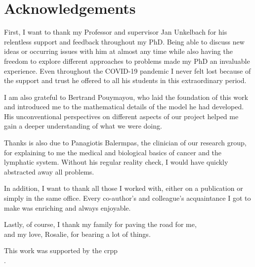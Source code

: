 \documentclass[\relativeRoot/main.tex]{subfiles}
\begin{document}


\chapter*{Acknowledgements}
First, I want to thank my Professor and supervisor Jan Unkelbach for his relentless support and feedback throughout my PhD. Being able to discuss new ideas or occurring issues with him at almost any time while also having the freedom to explore different approaches to problems made my PhD an invaluable experience. Even throughout the COVID-19 pandemic I never felt lost because of the support and trust he offered to all his students in this extraordinary period.

I am also grateful to Bertrand Pouymayou, who laid the foundation of this work and introduced me to the mathematical details of the model he had developed. His unconventional perspectives on different aspects of our project helped me gain a deeper understanding of what we were doing.

Thanks is also due to Panagiotis Balermpas, the clinician of our research group, for explaining to me the medical and biological basics of cancer and the lymphatic system. Without his regular reality check, I would have quickly abstracted away all problems.

In addition, I want to thank all those I worked with, either on a publication or simply in the same office. Every co-author's and colleague's acquaintance I got to make was enriching and always enjoyable.

Lastly, of course, I thank my family for paving the road for me,\\and my love, Rosalie, for bearing a lot of things.

\vspace{4cm}

This work was supported by the \gls{crpp}\\.
\end{document}
